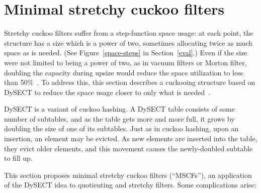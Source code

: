 \documentclass[letterpaper,twocolumn,10pt]{article}
\newcommand{\taffy}{stretchy}
\newcommand{\Taffy}{Stretchy}
\newcommand{\MTCF}{MSCF}
\newcommand{\taffy}{taffy}
\newcommand{\Taffy}{Taffy}
\newcommand{\MTCF}{MTCF}
\begin{document}




\section{Minimal \taffy{} cuckoo filters}
\label{mtcf}

\Taffy{} cuckoo filters suffer from a step-function space usage:
at each point, the structure has a size which is a power of two, sometimes allocating twice as much space as is needed. (See Figure~\ref{space-steps} in Section~\ref{eval}.)
Even if the size were not limited to being a power of two, as in vacuum filters or Morton filter, doubling the capacity during upsize would reduce the space utilization to less than 50\%~\cite{vacuum, morton-journal}.
To address this, this section describes a cuckooing structure based on DySECT to reduce the space usage closer to only what is needed~\cite{dysect}.

DySECT is a variant of cuckoo hashing.
A DySECT table consists of some number of subtables, and as the table gets more and more full, it grows by doubling the size of one of its subtables.
Just as in cuckoo hashing, upon an insertion, an element may be evicted.
As new elements are inserted into the table, they evict older elements, and this movement causes the newly-doubled subtable to fill up.

This section proposes minimal \taffy{} cuckoo filters (``\MTCF{}s''), an application of the DySECT idea to quotienting and \taffy{} filters.
Some complications arise:
\end{document}

